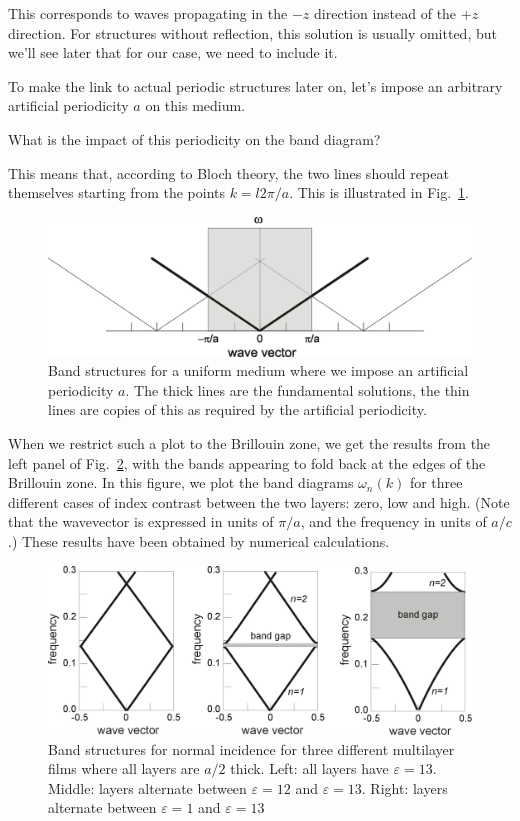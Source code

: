 This corresponds to waves propagating in the $-z$ direction instead of the $+z$ direction. For structures without reflection, this solution is usually omitted, but we'll see later that for our case, we need to include it.

To make the link to actual periodic structures later on, let's impose an arbitrary artificial periodicity $a$ on this medium.

\begin{cue}
What is the impact of this periodicity on the band diagram?
\end{cue}

This means that, according to Bloch theory, the two lines should repeat themselves starting from the points $k = l 2 \pi / a$. This is illustrated in Fig.~\ref{fig-1d-bands-uniform}.

\begin{figure}[H]
\centering
\includegraphics{symmetry/figures/band_folding_uniform}
\caption{Band structures for a uniform medium where we impose an artificial periodicity $a$. The thick lines are the fundamental solutions, the thin lines are copies of this as required by the artificial periodicity.}
\label{fig-1d-bands-uniform}
\end{figure}

When we restrict such a plot to the Brillouin zone, we get the results from the left panel of Fig.~\ref{fig-1d-bands}, with the bands appearing to fold back at the edges of the Brillouin zone. In this figure, we plot the band diagrams $\omega_n(k)$ for three different cases of index contrast between the two layers: zero, low and high. (Note that the wavevector is expressed in units of $\pi /a$, and the frequency in units of $a/c$.) These results have been obtained by numerical calculations.

\begin{figure}[H]
\centering
\includegraphics{symmetry/figures/1D_bands}
\caption{Band structures for normal incidence for three different multilayer films where all layers are $a/2$ thick. Left: all layers have $\varepsilon=13$. Middle: layers alternate between $\varepsilon=12$ and $\varepsilon=13$. Right: layers alternate between $\varepsilon=1$ and $\varepsilon=13$}
\label{fig-1d-bands}
\end{figure}


